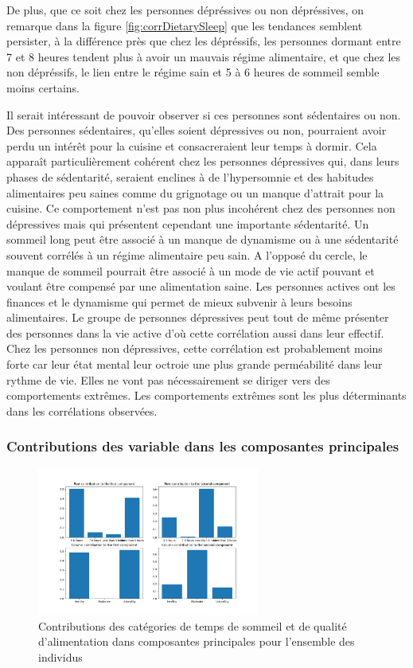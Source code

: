 De plus, que ce soit chez les personnes dépréssives ou non dépréssives, on remarque dans la figure \ref{fig:corrDietarySleep} que les tendances semblent persister, à la différence près que chez les dépréssifs, les personnes dormant entre 7 et 8 heures tendent plus à avoir un mauvais régime alimentaire, et que chez les non dépréssifs, le lien entre le régime sain et 5 à 6 heures de sommeil semble moins certains. 

Il serait intéressant de pouvoir observer si ces personnes sont sédentaires ou non. 
Des personnes sédentaires, qu’elles soient dépressives ou non, pourraient avoir perdu un intérêt pour la cuisine et consacreraient leur temps à dormir. Cela apparaît particulièrement cohérent chez les personnes dépressives qui, dans leurs phases de sédentarité, seraient enclines à de l’hypersomnie et des habitudes alimentaires peu saines comme du grignotage ou un manque d’attrait pour la cuisine. Ce comportement n’est pas non plus incohérent chez des personnes non dépressives mais qui présentent cependant une importante sédentarité. Un sommeil long peut être associé à un manque de dynamisme ou à une sédentarité souvent corrélés à un régime alimentaire peu sain.
A l’opposé du cercle, le manque de sommeil pourrait être associé à un mode de vie actif pouvant et voulant être compensé par une alimentation saine. Les personnes actives ont les finances et le dynamisme qui permet de mieux subvenir à leurs besoins alimentaires. Le groupe de personnes dépressives peut tout de même présenter des personnes dans la vie active d’où cette corrélation aussi dans leur effectif. Chez les personnes non dépressives, cette corrélation est probablement moins forte car leur état mental leur octroie une plus grande perméabilité dans leur rythme de vie. Elles ne vont pas nécessairement se diriger vers des comportements extrêmes.
Les comportements extrêmes sont les plus déterminants dans les corrélations observées.

\subsubsection{Contributions des variable dans les composantes principales}

\begin{figure}[H]
  \begin{center}
    \includegraphics[width=0.65\textwidth]{Images/Sleep_Dietary_all/RowColumnsContributions.png}
  \end{center}
  \caption{Contributions des catégories de temps de sommeil et de qualité d'alimentation dans composantes principales pour l'ensemble des individus}
  \label{fig:contribSleepDietaryAll}
\end{figure}

